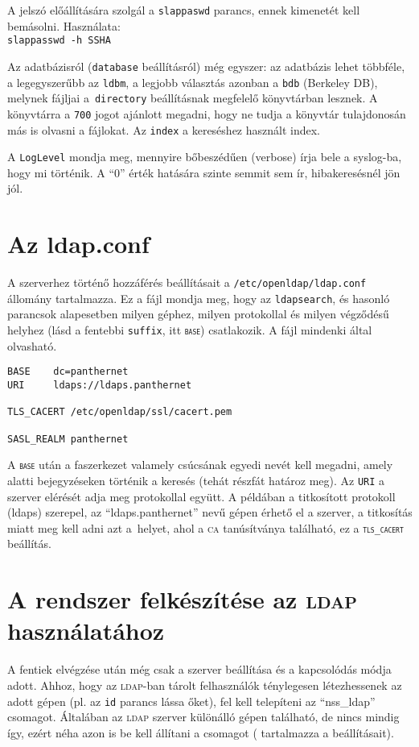A jelszó előállítására szolgál a \texttt{slappaswd} parancs, ennek kimenetét kell bemásolni. Használata:\\
\texttt{slappasswd -h {SSHA}}


Az adatbázisról (\texttt{database} beállításról) még egyszer: az adatbázis lehet többféle, a legegyszerűbb az
\texttt{ldbm}, a legjobb választás azonban a  \texttt{bdb} (Berkeley DB), melynek fájljai a~\texttt{directory}
beállításnak megfelelő könyvtárban lesznek. A könyvtárra a \texttt{700} jogot ajánlott megadni, hogy ne tudja a
könyvtár tulajdonosán más is olvasni a fájlokat. Az  \texttt{index} a  kereséshez használt index.

A \texttt{LogLevel} mondja meg, mennyire bőbeszédűen (verbose) írja bele a syslog-ba, hogy mi történik. A ``0'' érték
hatására szinte semmit sem ír, hibakeresésnél jön jól.

\section{Az ldap.conf}
A szerverhez történő hozzáférés beállításait a \texttt{/etc/openldap/ldap.conf} állomány tartalmazza.
Ez a fájl mondja meg, hogy az \texttt{ldapsearch}, és hasonló parancsok alapesetben milyen géphez, milyen protokollal
és milyen végződésű helyhez (lásd a fentebbi \texttt{suffix}, itt \texttt{\textsc{base}}) csatlakozik. A fájl mindenki által
olvasható.

\begin{Verbatim}[frame=single,label=ldap.conf]
BASE    dc=panthernet
URI     ldaps://ldaps.panthernet

TLS_CACERT /etc/openldap/ssl/cacert.pem

SASL_REALM panthernet
\end{Verbatim}


A \texttt{\textsc{base}} után a faszerkezet valamely csúcsának egyedi nevét kell megadni, amely alatti bejegyzéseken történik a
keresés (tehát részfát határoz meg). Az \texttt{URI} a szerver elérését adja meg protokollal együtt. A példában
a titkosított protokoll (ldaps) szerepel, az ``ldaps.panthernet'' nevű gépen érhető el a szerver, a titkosítás miatt meg
kell adni azt a~helyet, ahol a \textsc{ca} tanúsítványa található, ez a \texttt{\textsc{tls}\_\textsc{cacert}} beállítás.

\section{A rendszer felkészítése az \textsc{ldap} használatához}
A fentiek elvégzése után még csak a szerver beállítása és a kapcsolódás módja adott. Ahhoz, hogy az \textsc{ldap}-ban tárolt
felhasználók ténylegesen létezhessenek az adott gépen (pl. az \texttt{id} parancs lássa őket), fel kell telepíteni 
az ``nss\_ldap'' csomagot. Általában az \textsc{ldap}
szerver különálló gépen található, de nincs mindig így, ezért néha azon is be kell állítani a csomagot
( tartalmazza a beállításait).

